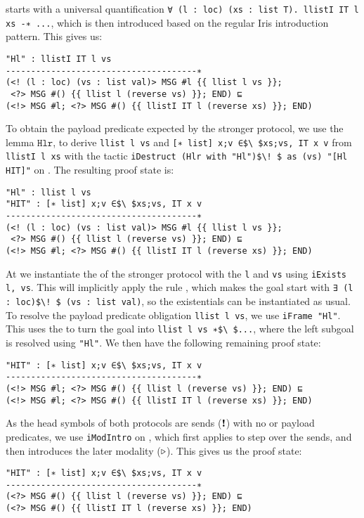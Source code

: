 starts with a universal quantification
\lstinline{∀ (l : loc) (xs : list T). llistI IT l xs -∗ ...},
which is then introduced based on the regular Iris introduction pattern.
This gives us:
\begin{lstlisting}
"Hl" : llistI IT l vs
--------------------------------------∗
(<! (l : loc) (vs : list val)> MSG #l {{ llist l vs }};
 <?> MSG #() {{ llist l (reverse vs) }}; END) ⊑
(<!> MSG #l; <?> MSG #() {{ llistI IT l (reverse xs) }}; END)
\end{lstlisting}
To obtain the payload predicate expected by the stronger protocol,
we use the lemma $\mathtt{Hlr}$,
to derive \lstinline{llist l vs} and
\lstinline{[∗ list] x;v ∈$\ $xs;vs, IT x v} from
\lstinline{llistI l xs} with the tactic
\lstinline{iDestruct (Hlr with "Hl")$\! $ as (vs) "[Hl HIT]"} on
.
The resulting proof state is:
\begin{lstlisting}
"Hl" : llist l vs
"HIT" : [∗ list] x;v ∈$\ $xs;vs, IT x v
--------------------------------------∗
(<! (l : loc) (vs : list val)> MSG #l {{ llist l vs }};
 <?> MSG #() {{ llist l (reverse vs) }}; END) ⊑
(<!> MSG #l; <?> MSG #() {{ llistI IT l (reverse xs) }}; END)
\end{lstlisting}
At  we
instantiate the \binders of the stronger protocol with the
\binders \lstinline{l} and \lstinline{vs} using \lstinline{iExists l, vs}.
This will implicitly apply the rule , which makes the goal
start with \lstinline{∃ (l : loc)$\! $ (vs : list val)}, so the existentials
can be instantiated as usual.
To resolve the payload predicate obligation \lstinline{llist l vs}, we use
\lstinline{iFrame "Hl"}.
This uses the  to turn the goal into
\lstinline{llist l vs ∗$\ $...}, where the left subgoal is resolved using
\lstinline{"Hl"}.
We then have the following remaining proof state:
\begin{lstlisting}
"HIT" : [∗ list] x;v ∈$\ $xs;vs, IT x v
--------------------------------------∗
(<!> MSG #l; <?> MSG #() {{ llist l (reverse vs) }}; END) ⊑
(<!> MSG #l; <?> MSG #() {{ llistI IT l (reverse xs) }}; END)
\end{lstlisting}
As the head symbols of both protocols are sends ($\textnormal{\bf !}$) with no \binders or
payload predicates, we use \lstinline{iModIntro}
on , which first applies
 to step over the sends, and then
introduces the later modality ($\mathop{{\triangleright}}$).
This gives us the proof state:
\begin{lstlisting}
"HIT" : [∗ list] x;v ∈$\ $xs;vs, IT x v
--------------------------------------∗
(<?> MSG #() {{ llist l (reverse vs) }}; END) ⊑
(<?> MSG #() {{ llistI IT l (reverse xs) }}; END)
\end{lstlisting}
